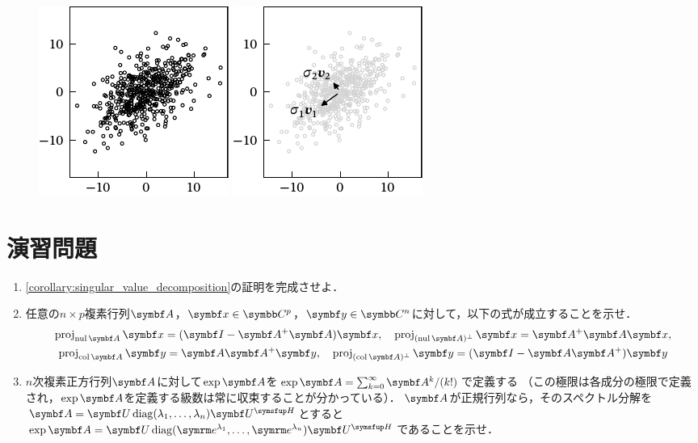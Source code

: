 \documentclass[../../main]{subfiles}
\begin{document}
\begin{figure}[htbp]
  \begin{minipage}{\linewidth/2}
    \centering
    \includegraphics{figures/scatter.pdf}
  \end{minipage}%
  \begin{minipage}{\linewidth/2}
    \centering
    \includegraphics{figures/pca.pdf}
  \end{minipage}
\end{figure}

\section{演習問題}

\begin{enumerate}
  \item \cref{corollary:singular_value_decomposition}の証明を完成させよ．
  \item 任意の\(n\times p\)複素行列\(\mat{A}\)，\(\vect{x}\in\numset{C}^p\)，\(\vect{y}\in\numset{C}^n\)に対して，以下の式が成立することを示せ．
    \begin{gather*}
      \proj_{\nulsp\mat{A}}\vect{x} = (\imat-\pinv{\mat{A}}\mat{A})\vect{x},
      \quad\proj_{\pcomp{(\nulsp\mat{A})}}\vect{x} = \pinv{\mat{A}}\mat{A}\vect{x}, \\
      \proj_{\colsp\mat{A}}\vect{y} = \mat{A}\pinv{\mat{A}}\vect{y},
      \quad\proj_{\pcomp{(\colsp\mat{A})}}\vect{y} = (\imat-\mat{A}\pinv{\mat{A}})\vect{y}
    \end{gather*}
  \item \(n\)次複素正方行列\(\mat{A}\)に対して\(\exp\mat{A}\)を\(\exp\mat{A}=\sum_{k=0}^\infty\mat{A}^k/(k!)\)で定義する
    （この極限は各成分の極限で定義され，\(\exp\mat{A}\)を定義する級数は常に収束することが分かっている）．
    \(\mat{A}\)が正規行列なら，そのスペクトル分解を\(\mat{A}=\mat{U}\diag(\lambda_1,\dots,\lambda_n)\htrps{\mat{U}}\)とすると
    \(\exp\mat{A}=\mat{U}\diag(\napr^{\lambda_1},\dots,\napr^{\lambda_n})\htrps{\mat{U}}\)であることを示せ．
\end{enumerate}
\end{document}
